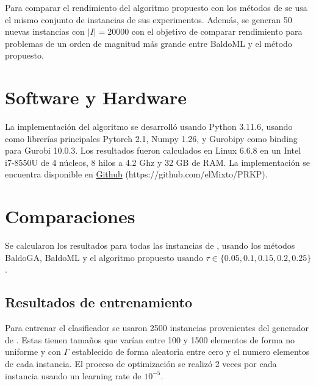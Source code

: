 \documentclass[spanish, a4paper, 12pt, openany,final]{book}
\begin{document}
Para comparar el rendimiento del algoritmo propuesto con los métodos de \cite{baldo_polynomial_2023} se usa el mismo conjunto de instancias de sus experimentos. Además, se generan 50 nuevas instancias con $|I| = 20000$ con el objetivo de comparar rendimiento para problemas de un orden de magnitud más grande entre BaldoML y el método propuesto.

\section{Software y Hardware}

La implementación del algoritmo se desarrolló usando Python 3.11.6, usando como librerías principales Pytorch 2.1, Numpy 1.26, y Gurobipy como binding para Gurobi 10.0.3. Los resultados fueron calculados en Linux 6.6.8 en un Intel i7-8550U de 4 núcleos, 8 hilos a 4.2 Ghz y 32 GB de RAM. La implementación se encuentra disponible en \href{https://github.com/elMixto/PRKP.git}{Github} (https://github.com/elMixto/PRKP).

\section{Comparaciones}


Se calcularon los resultados para todas las instancias de \cite{baldo_polynomial_2023}, usando los métodos BaldoGA, BaldoML y el algoritmo propuesto usando $\tau \in \{0.05,0.1,0.15,0.2,0.25 \}$.


\subsection*{Resultados de entrenamiento}

Para entrenar el clasificador se usaron 2500 instancias provenientes del generador de \cite{baldo_polynomial_2023}. Estas tienen tamaños que varían entre 100 y 1500 elementos de forma no uniforme y con $\Gamma$ establecido de forma aleatoria entre cero y el numero elementos de cada instancia. El proceso de optimización se realizó 2 veces por cada instancia usando un learning rate de $10^{-5}$.
\end{document}
